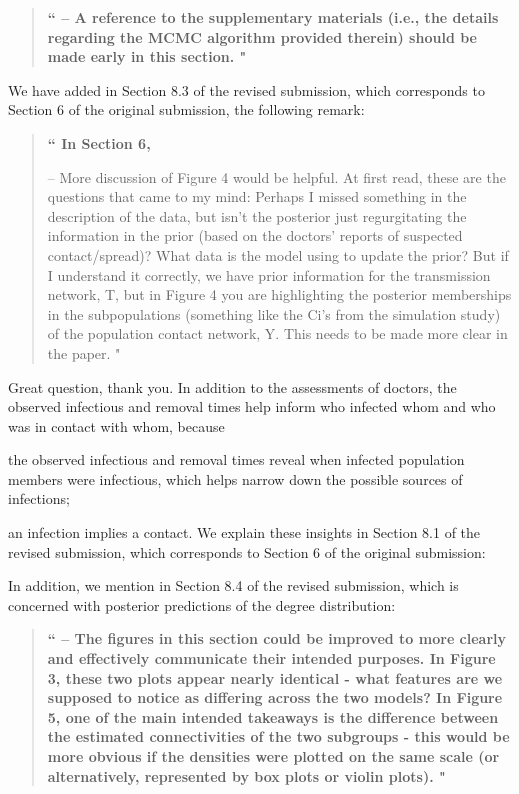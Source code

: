 \documentclass[12pt]{article}
\renewcommand{\=}{&=&}
\renewcommand{\bbq}{\vspace{.05cm}\begin{quote}\bf``}
\renewcommand{\ebq}{\hspace{-.15cm}"\end{quote}}
\newcommand{\bauthq}{\vspace{.05cm}\begin{quote}\em}
\newcommand{\eauthq}{\hspace{-.25cm}\end{quote}}
\renewcommand{\=}{&=&}
\begin{document}
\bbq
– A reference to the supplementary materials (i.e., the details regarding the MCMC algorithm provided therein) should be made early in this section.
\ebq

We have added in Section 8.3 of the revised submission,
which corresponds to Section 6 of the original submission,
the following remark:
\bauthq\eauthq

\vspace{-.25cm}

\bbq
In Section 6,

– More discussion of Figure 4 would be helpful. At first read, these are the questions that came to my mind: Perhaps I missed something in the description of the data, but isn’t the posterior just regurgitating the information in the prior (based on the doctors’ reports of suspected contact/spread)? What data is the model using to update the prior? But if I understand it correctly, we have prior information for the transmission network, T, but in Figure 4 you are highlighting the posterior memberships in the subpopulations (something like the Ci’s from the simulation study) of the population contact network, Y. This needs to be made more clear in the paper.
\ebq

Great question,
thank you.
In addition to the assessments of doctors,
the observed infectious and removal times help inform who infected whom and who was in contact with whom,
because 
\bi
\item the observed infectious and removal times reveal when infected population members were infectious,
which helps narrow down the possible sources of infections;
\item an infection implies a contact.
\ei
We explain these insights in Section 8.1 of the revised submission,
which corresponds to Section 6 of the original submission:
\bauthq\eauthq
In addition,
we mention in Section 8.4 of the revised submission,
which is concerned with posterior predictions of the degree distribution: 
\bauthq\eauthq

\bbq
– The figures in this section could be improved to more clearly and effectively communicate their intended purposes. In Figure 3, these two plots appear nearly identical - what features are we supposed to notice as differing across the two models? In Figure 5, one of the main intended takeaways is the difference between the estimated connectivities of the two subgroups - this would be more obvious if the densities were plotted on the same scale (or alternatively, represented by box plots or violin plots).
\ebq
\end{document}
